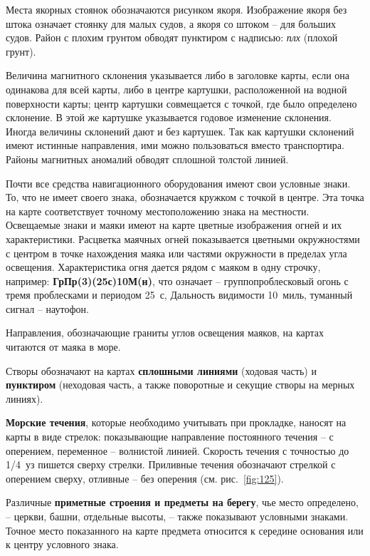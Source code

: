 \documentclass[a4paper, 12pt, twoside, final, book, russian, fittopage, cyremdash]{ncc}
\newcommand{\ris}[1]{\ref{fig:#1}}
\begin{document}
Места якорных стоянок обозначаются рисунком якоря. Изображение якоря без штока означает стоянку для малых судов, а якоря со штоком \--- для больших судов. Район с плохим грунтом обводят пунктиром с надписью: \textit{плх} (плохой грунт). 

Величина магнитного склонения указывается либо в заголовке карты, если она одинакова для всей карты, либо в центре картушки, расположенной на водной поверхности карты; центр картушки совмещается с точкой, где было определено склонение. В этой же картушке указывается годовое изменение склонения. Иногда величины склонений дают и без картушек. Так как картушки склонений имеют истинные направления, ими можно пользоваться вместо транспортира. Районы магнитных аномалий обводят сплошной толстой линией. 

Почти все средства навигационного оборудования имеют свои условные знаки. То, что не имеет своего знака, обозначается кружком с точкой в центре. Эта точка на карте соответствует точному местоположению знака на местности. Освещаемые знаки и маяки имеют на карте цветные изображения огней и их характеристики. Расцветка маячных огней показывается цветными окружностями с центром в точке нахождения маяка или частями окружности в пределах угла освещения. Характеристика огня дается рядом с маяком в одну строчку, например: \textbf{ГрПр(3)(25с)10М(н)}, что означает \--- группопроблесковый огонь с тремя проблесками и периодом 25~с, Дальность видимости 10~миль, туманный сигнал \--- наутофон. 

Направления, обозначающие граниты углов освещения маяков, на картах читаются от маяка в море. 

Створы обозначают на картах \textbf{сплошными линиями} (ходовая часть) и \textbf{пунктиром} (неходовая часть, а также поворотные и секущие створы на мерных линиях).

\textbf{Морские течения}, которые необходимо учитывать при прокладке, наносят на карты в виде стрелок: показывающие направление постоянного течения \--- с оперением, переменное \--- волнистой линией. Скорость течения с точностью до 1/4~уз пишется сверху стрелки. Приливные течения обозначают стрелкой с оперением сверху, отливные \--- без оперения (см. рис.~\ris{125}). 

Различные \textbf{приметные строения и предметы на берегу}, чье место определено, \--- церкви, башни, отдельные высоты, \--- также показывают условными знаками. Точное место показанного на карте предмета относится к середине основания или к центру условного знака. 
\end{document}
